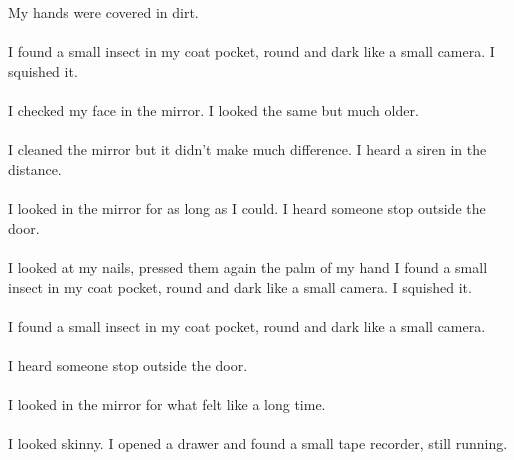 \documentclass{article}
\begin{document}
    \section{}
    My hands were covered in dirt. \\\\I found a small insect in my coat pocket, round and dark like a small camera. I squished it. \\\\I checked my face in the mirror. I looked the same but much older. \\\\I cleaned the mirror but it didn't make much difference. I heard a siren in the distance. \\\\I looked in the mirror for as long as I could. I heard someone stop outside the door. \\\\I looked at my nails, pressed them again the palm of my hand I found a small insect in my coat pocket, round and dark like a small camera. I squished it. \\\\I found a small insect in my coat pocket, round and dark like a small camera. \\\\I heard someone stop outside the door. \\\\I looked in the mirror for what felt like a long time. \\\\I looked skinny. I opened a drawer and found a small tape recorder, still running. \\\\
    \newpage
    
\end{document}
